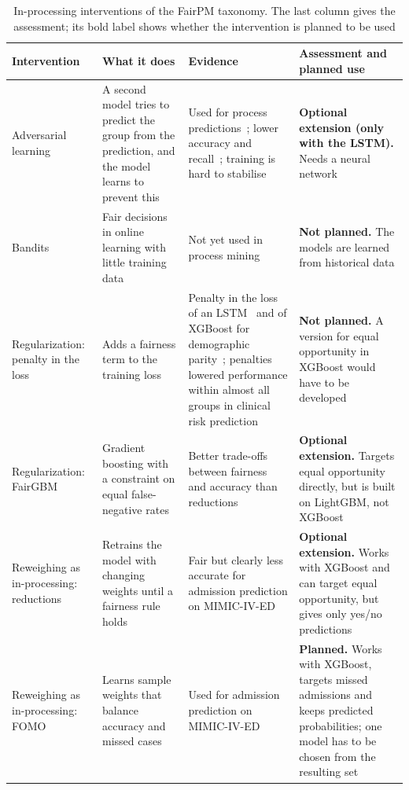 \begin{table}[htbp]
  \centering
  \footnotesize
  \caption{In-processing interventions of the FairPM taxonomy. The last column gives the assessment; its bold label shows whether the intervention is planned to be used}\label{table::inprocessing}
  \begin{tabularx}{\textwidth}{@{}>{\raggedright\arraybackslash}p{2.5cm}>{\raggedright\arraybackslash}X>{\raggedright\arraybackslash}X>{\raggedright\arraybackslash}X@{}}
    \toprule
    \textbf{Intervention} & \textbf{What it does} & \textbf{Evidence} & \textbf{Assessment and planned use} \\
    \midrule
    Adversarial learning & A second model tries to predict the group from the prediction, and the model learns to prevent this & Used for process predictions~\cite{deleoni2025achieving,dasilva2025towards}; lower accuracy and recall~\cite{dasilva2025towards}; training is hard to stabilise~\cite{zhang2018mitigating} & \textbf{Optional extension (only with the LSTM).} Needs a neural network \\ \addlinespace[0.8ex]
    Bandits & Fair decisions in online learning with little training data & Not yet used in process mining~\cite{revoredo2026fairpm} & \textbf{Not planned.} The models are learned from historical data \\ \addlinespace[0.8ex]
    Regularization: penalty in the loss & Adds a fairness term to the training loss & Penalty in the loss of an LSTM~\cite{peeperkorn2025achieving} and of XGBoost for demographic parity~\cite{ravichandran2020fairxgboost}; penalties lowered performance within almost all groups in clinical risk prediction~\cite{pfohl2021empirical} & \textbf{Not planned.} A version for equal opportunity in XGBoost would have to be developed \\ \addlinespace[0.8ex]
    Regularization: FairGBM & Gradient boosting with a constraint on equal false-negative rates & Better trade-offs between fairness and accuracy than reductions~\cite{cruz2023fairgbm} & \textbf{Optional extension.} Targets equal opportunity directly, but is built on LightGBM, not XGBoost \\ \addlinespace[0.8ex]
    Reweighing as in-processing: reductions & Retrains the model with changing weights until a fairness rule holds~\cite{agarwal2018reductions} & Fair but clearly less accurate for admission prediction on MIMIC-IV-ED~\cite{liu2024faim} & \textbf{Optional extension.} Works with XGBoost and can target equal opportunity, but gives only yes/no predictions~\cite{cruz2023fairgbm} \\ \addlinespace[0.8ex]
    Reweighing as in-processing: FOMO & Learns sample weights that balance accuracy and missed cases~\cite{lacava2023optimizing} & Used for admission prediction on MIMIC-IV-ED~\cite{lett2025intersectional} & \textbf{Planned.} Works with XGBoost, targets missed admissions and keeps predicted probabilities; one model has to be chosen from the resulting set \\
    \bottomrule
  \end{tabularx}
\end{table}

